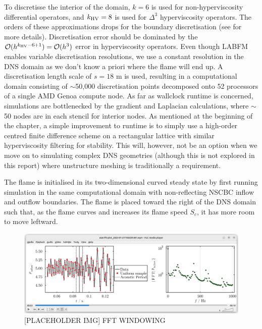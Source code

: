 To discretisse the interior of the domain, $k = 6$ is used for non-hyperviscosity differential operators, and $k_{\rm{HV}} = 8$ is used for $Δ^3$ hyperviscosity operators. The orders of these approximations drops for the boundary discretisation (see \cite{king2022HighOrderSimulationsIsothermal} for more details). Discretisation error should be dominated by the $\cl{O}(h^{k_{\rm{HV}} - 6 + 1}) = \cl{O}(h^{3})$ error in hyperviscosity operators. Even though LABFM enables variable discretisation resolutions, we use a constant resolution in the DNS domain as we don't know a priori where the flame will end up. A discretisation length scale of $s = 18$ {\textmu}m is used, resulting in a computational domain consisting of $\sim$50,000 discretisation points decomposed onto 52 processors of a single AMD Genoa compute node. As far as wallclock runtime is concerned, simulations are bottlenecked by the gradient and Laplacian calculations, where $\sim$50 nodes are in each stencil for interior nodes. As mentioned at the beginning of the chapter, a simple improvement to runtime is to simply use a high-order centred finite difference scheme on a rectangular lattice with similar hyperviscosity filtering for stability. This will, however, not be an option when we move on to simulating complex DNS geometries (although this is not explored in this report) where unstructure meshing is traditionally a requirement.

The flame is initialised in its two-dimensional curved steady state by first running simulation in the same computational domain with non-reflecting NSCBC inflow and outflow boundaries. The flame is placed toward the right of the DNS domain such that, as the flame curves and increases its flame speed $S_c$, it has more room to move leftward.











\begin{figure}[t]
\centering
\includegraphics[scale=0.35]{assets/graphs/fft-windowing.png}
\caption{[PLACEHOLDER IMG] FFT WINDOWING}
\label{fig:windowing}
\end{figure}

